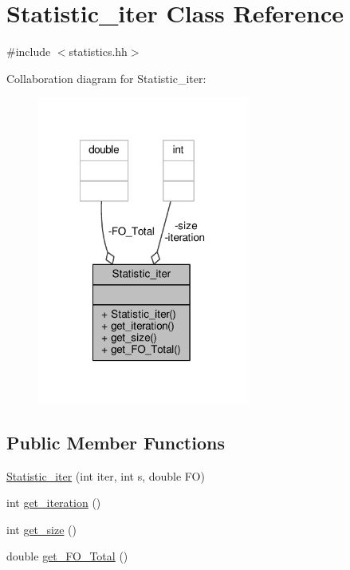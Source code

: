 \hypertarget{classStatistic__iter}{\section{Statistic\-\_\-iter Class Reference}
\label{classStatistic__iter}
}


{\ttfamily \#include $<$statistics.\-hh$>$}



Collaboration diagram for Statistic\-\_\-iter\-:
\nopagebreak
\begin{figure}[H]
\begin{center}
\leavevmode
\includegraphics[width=197pt]{classStatistic__iter__coll__graph}
\end{center}
\end{figure}
\subsection*{Public Member Functions}
\begin{DoxyCompactItemize}
\item 
\hyperlink{classStatistic__iter_a73b50c3786507016143ab5d438405ac6}{Statistic\-\_\-iter} (int iter, int s, double F\-O)
\item 
int \hyperlink{classStatistic__iter_ace06be19a5b3813b315dae44b5b3f6e7}{get\-\_\-iteration} ()
\item 
int \hyperlink{classStatistic__iter_a5ccad38b82ce4a06e11321ae3fdd2fc6}{get\-\_\-size} ()
\item 
double \hyperlink{classStatistic__iter_a38fc7e962059a8e492a2e9d1e89c5f5d}{get\-\_\-\-F\-O\-\_\-\-Total} ()
\end{DoxyCompactItemize}
